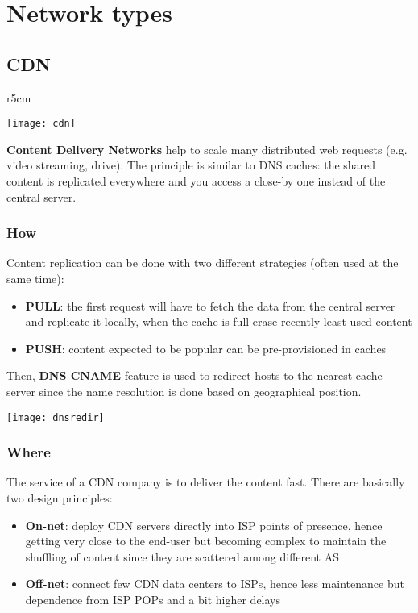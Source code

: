 \newpage
\section{Network types}
\subsection{CDN}
\begin{wrapfigure}[11]{r}{5cm}
	\vspace{-1cm}
	\begin{center}
		\texttt{[image: cdn]}
	\end{center}
\end{wrapfigure}
\textbf{Content Delivery Networks} help to scale many distributed web requests (e.g. video streaming, drive). The principle is similar to DNS caches: the shared content is replicated everywhere and you access a close-by one instead of the central server.
\subsubsection{How}
Content replication can be done with two different strategies (often used at the same time):
\begin{itemize}
	\item \textbf{PULL}: the first request will have to fetch the data from the central server and replicate it locally, when the cache is full erase recently least used content
	\item \textbf{PUSH}: content expected to be popular can be pre-provisioned in caches
\end{itemize}
Then, \textbf{DNS CNAME} feature is used to redirect hosts to the nearest cache server since the name resolution is done based on geographical position.
\begin{center}
	\texttt{[image: dnsredir]}
\end{center}

\subsubsection{Where}
The service of a CDN company is to deliver the content fast. There are basically two design principles:
\begin{itemize}
	\item \textbf{On-net}: deploy CDN servers directly into ISP points of presence, hence getting very close to the end-user but becoming complex to maintain the shuffling of content since they are scattered among different AS
	\item \textbf{Off-net}: connect few CDN data centers to ISPs, hence less maintenance but dependence from ISP POPs and a bit higher delays
\end{itemize}

